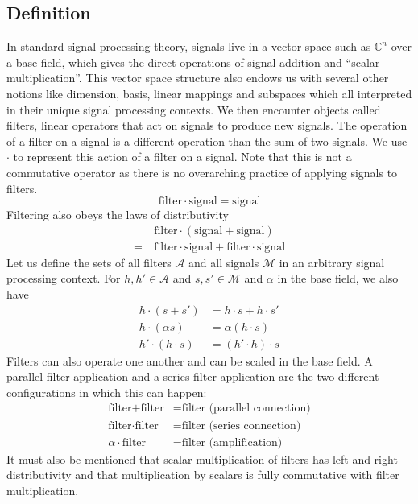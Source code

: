 \documentclass[12pt,technote]{IEEEtran}
\begin{document}
\subsection{Definition}
In standard signal processing theory, signals live in a vector space such as $\mathbb{C}^n$ over a base field, which gives the direct operations of signal addition and ``scalar multiplication''. This vector space structure also endows us with several other notions like dimension, basis, linear mappings and subspaces which all interpreted in their unique signal processing contexts. We then encounter objects called filters, linear operators that act on signals to produce new signals. The operation of a filter on a signal is a different operation than the sum of two signals. We use $\cdot$ to represent this action of a filter on a signal. Note that this is not a commutative operator as there is no overarching practice of applying signals to filters.
\begin{equation*}
    \text{filter}\cdot\text{signal} = \text{signal}
\end{equation*}
Filtering also obeys the laws of distributivity
\begin{align*}
    &\text{filter}\cdot (\text{signal} + \text{signal}) \\
    =\ &\text{filter}\cdot \text{signal} + \text{filter}\cdot\text{signal}
\end{align*}
Let us define the sets of all filters $\mathcal{A}$ and all signals $\mathcal{M}$ in an arbitrary signal processing context. For $h,h'\in \mathcal{A}$ and $s,s'\in\mathcal{M}$ and $\alpha$ in the base field, we also have
\begin{align*}
    h\cdot (s + s') &= h\cdot s + h\cdot s'\\
    h\cdot (\alpha s) &= \alpha (h\cdot s)\\
    h'\cdot (h\cdot s) &= (h'\cdot h)\cdot s
\end{align*}
Filters can also operate one another and can be scaled in the base field. A parallel filter application and a series filter application are the two different configurations in which this can happen:
\begin{align*}
    \text{filter} + \text{filter} &= \text{filter (parallel connection)}\\
    \text{filter} \cdot \text{filter} &= \text{filter (series connection)}\\
    \alpha\cdot\text{filter} &= \text{filter (amplification)}
\end{align*}
It must also be mentioned that scalar multiplication of filters has left and right-distributivity and that multiplication by scalars is fully commutative with filter multiplication.
\end{document}
